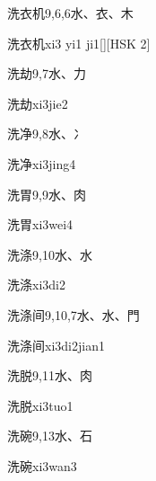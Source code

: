 \begin{entry}{洗衣机}{9,6,6}{⽔、⾐、⽊}
  \begin{phonetics}{洗衣机}{xi3 yi1 ji1}[][HSK 2]
  \end{phonetics}
\end{entry}

\begin{entry}{洗劫}{9,7}{⽔、⼒}
  \begin{phonetics}{洗劫}{xi3jie2}
  \end{phonetics}
\end{entry}

\begin{entry}{洗净}{9,8}{⽔、⼎}
  \begin{phonetics}{洗净}{xi3jing4}
  \end{phonetics}
\end{entry}

\begin{entry}{洗胃}{9,9}{⽔、⾁}
  \begin{phonetics}{洗胃}{xi3wei4}
  \end{phonetics}
\end{entry}

\begin{entry}{洗涤}{9,10}{⽔、⽔}
  \begin{phonetics}{洗涤}{xi3di2}
  \end{phonetics}
\end{entry}

\begin{entry}{洗涤间}{9,10,7}{⽔、⽔、⾨}
  \begin{phonetics}{洗涤间}{xi3di2jian1}
  \end{phonetics}
\end{entry}

\begin{entry}{洗脱}{9,11}{⽔、⾁}
  \begin{phonetics}{洗脱}{xi3tuo1}
  \end{phonetics}
\end{entry}

\begin{entry}{洗碗}{9,13}{⽔、⽯}
  \begin{phonetics}{洗碗}{xi3wan3}
  \end{phonetics}
\end{entry}

